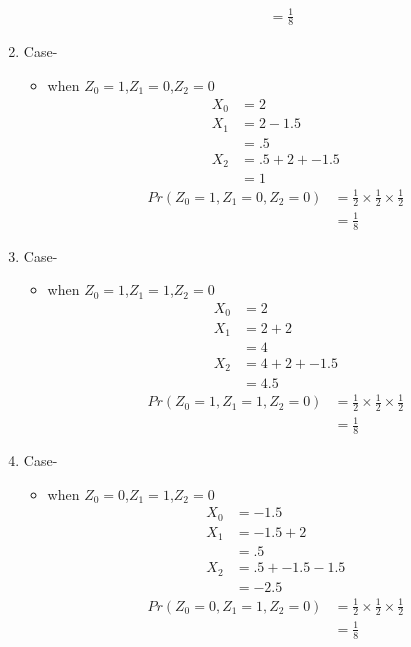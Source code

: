 \documentclass[11pt,a4paper,twocolumn]{article}
\begin{document}
\begin{enumerate}
\begin{itemize}
\begin{align*}
            &=\frac{1}{8}
        \end{align*}
    \end{itemize}
     \item Case-
    \begin{itemize}
        \item when $Z_{0}=1$,$Z_{1}=0$,$Z_{2}=0$\\
        \begin{align*}
            X_{0}&=2\\
            X_{1}&=2-1.5\\
            &=.5\\
            X_{2}&=.5+2+-1.5\\
            &=1
        \end{align*}
        \begin{align*}
            Pr(Z_{0}=1,Z_{1}=0,Z_{2}=0)&=\frac{1}{2}\times\frac{1}{2}\times\frac{1}{2}\\
            &=\frac{1}{8}
        \end{align*}
    \end{itemize}
    \item Case-
    \begin{itemize}
        \item when $Z_{0}=1$,$Z_{1}=1$,$Z_{2}=0$\\
        \begin{align*}
            X_{0}&=2\\
            X_{1}&=2+2\\
            &=4\\
            X_{2}&=4+2+-1.5\\
            &=4.5
        \end{align*}
        \begin{align*}
            Pr(Z_{0}=1,Z_{1}=1,Z_{2}=0)&=\frac{1}{2}\times\frac{1}{2}\times\frac{1}{2}\\
            &=\frac{1}{8}
        \end{align*}
    \end{itemize}
    \item Case-
    \begin{itemize}
        \item when $Z_{0}=0$,$Z_{1}=1$,$Z_{2}=0$\\
        \begin{align*}
            X_{0}&=-1.5\\
            X_{1}&=-1.5+2\\
            &=.5\\
            X_{2}&=.5+-1.5-1.5\\
            &=-2.5
        \end{align*}
        \begin{align*}
            Pr(Z_{0}=0,Z_{1}=1,Z_{2}=0)&=\frac{1}{2}\times\frac{1}{2}\times\frac{1}{2}\\
            &=\frac{1}{8}
        \end{align*}
    \end{itemize}
\end{enumerate}
\end{document}
